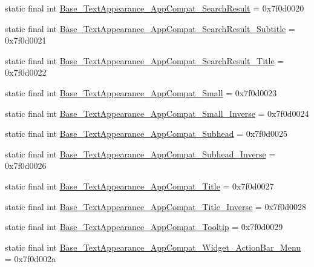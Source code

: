 \begin{DoxyCompactItemize}
\item 
static final int \mbox{\hyperlink{classandroid_1_1support_1_1design_1_1_r_1_1style_a14e4224cdc4bb8704fd715e3af93873f}{Base\+\_\+\+Text\+Appearance\+\_\+\+App\+Compat\+\_\+\+Search\+Result}} = 0x7f0d0020
\item 
static final int \mbox{\hyperlink{classandroid_1_1support_1_1design_1_1_r_1_1style_a37d10e72cc62481528c68beffbf407b7}{Base\+\_\+\+Text\+Appearance\+\_\+\+App\+Compat\+\_\+\+Search\+Result\+\_\+\+Subtitle}} = 0x7f0d0021
\item 
static final int \mbox{\hyperlink{classandroid_1_1support_1_1design_1_1_r_1_1style_a3d7e0d19cd7ef91300834b97feba3511}{Base\+\_\+\+Text\+Appearance\+\_\+\+App\+Compat\+\_\+\+Search\+Result\+\_\+\+Title}} = 0x7f0d0022
\item 
static final int \mbox{\hyperlink{classandroid_1_1support_1_1design_1_1_r_1_1style_aa05b5049493d12c414a207aeea21470f}{Base\+\_\+\+Text\+Appearance\+\_\+\+App\+Compat\+\_\+\+Small}} = 0x7f0d0023
\item 
static final int \mbox{\hyperlink{classandroid_1_1support_1_1design_1_1_r_1_1style_a49b25eb5aeaf9b46ee955c20c5d74325}{Base\+\_\+\+Text\+Appearance\+\_\+\+App\+Compat\+\_\+\+Small\+\_\+\+Inverse}} = 0x7f0d0024
\item 
static final int \mbox{\hyperlink{classandroid_1_1support_1_1design_1_1_r_1_1style_afdbc5e904b5c8a78ec4d8dcf8a976480}{Base\+\_\+\+Text\+Appearance\+\_\+\+App\+Compat\+\_\+\+Subhead}} = 0x7f0d0025
\item 
static final int \mbox{\hyperlink{classandroid_1_1support_1_1design_1_1_r_1_1style_a391e6f44fa78e45e80ca3d5cf698c53d}{Base\+\_\+\+Text\+Appearance\+\_\+\+App\+Compat\+\_\+\+Subhead\+\_\+\+Inverse}} = 0x7f0d0026
\item 
static final int \mbox{\hyperlink{classandroid_1_1support_1_1design_1_1_r_1_1style_aaeb1ba36694a5afaceb50327101c788c}{Base\+\_\+\+Text\+Appearance\+\_\+\+App\+Compat\+\_\+\+Title}} = 0x7f0d0027
\item 
static final int \mbox{\hyperlink{classandroid_1_1support_1_1design_1_1_r_1_1style_a1128f32591ae2aade3e42c5d6f4c7c3d}{Base\+\_\+\+Text\+Appearance\+\_\+\+App\+Compat\+\_\+\+Title\+\_\+\+Inverse}} = 0x7f0d0028
\item 
static final int \mbox{\hyperlink{classandroid_1_1support_1_1design_1_1_r_1_1style_a421c9f4e1903b79ba9abce614e664d98}{Base\+\_\+\+Text\+Appearance\+\_\+\+App\+Compat\+\_\+\+Tooltip}} = 0x7f0d0029
\item 
static final int \mbox{\hyperlink{classandroid_1_1support_1_1design_1_1_r_1_1style_a631791e6b12ffaa53f20b6ff3b5b42d1}{Base\+\_\+\+Text\+Appearance\+\_\+\+App\+Compat\+\_\+\+Widget\+\_\+\+Action\+Bar\+\_\+\+Menu}} = 0x7f0d002a

\end{DoxyCompactItemize}
